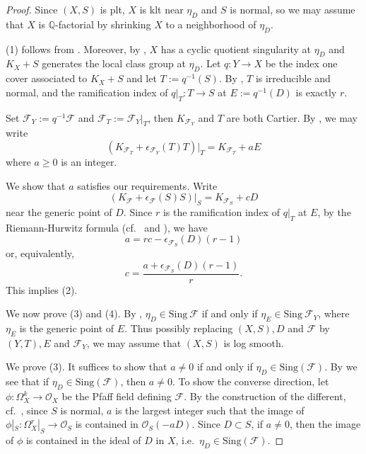 \documentclass[11pt,reqno]{amsart}
\numberwithin{equation}{section}
\newcommand{\Ff}{\mathcal{F}}
\newcommand{\Sing}{\mathrm{Sing}}
\theoremstyle{definition}
\begin{document}
\begin{proof}
Since $(X,S)$ is plt, $X$ is klt near $\eta_D$ and $S$ is normal, so we may assume that $X$ is $\mathbb Q$-factorial by shrinking $X$ to a neighborhood of $\eta_D$.

(1) follows from \cite[16.6 Proposition]{Kol+92}. Moreover, by  \cite[16.6 Proposition]{Kol+92}, $X$ has a cyclic quotient singularity at $\eta_D$ and $K_X+S$ generates the local class group at $\eta_D$. Let $q\colon Y\rightarrow X$ be the index one cover associated to $K_X+S$ and let $T:=q^{-1}(S)$. By \cite[16.6 Proposition]{Kol+92}, $T$ is irreducible and normal, and the ramification index of $q|_T: T\rightarrow S$ at $E:=q^{-1}(D)$ is exactly $r$. 

Set $\Ff_Y:=q^{-1}\Ff$ and $\Ff_T:=\Ff_Y|_T$, then $K_{\Ff_Y}$ and $T$ are both Cartier. By \cite[Proposition-Definition~3.7]{CS25a}, we may write
$$(K_{\Ff_T}+\epsilon_{\Ff_Y}(T)T)|_T=K_{\Ff_T}+aE$$
where $a\geq 0$ is an integer.

We show that $a$ satisfies our requirements. Write
$$(K_{\Ff}+\epsilon_{\Ff}(S)S)|_S=K_{\Ff_S}+cD$$
near the generic point of $D$. Since $r$ is the ramification index of $q|_T$ at $E$, by the Riemann-Hurwitz formula (cf.~\cite[Lemma~3.4]{Dru21} and \cite[Proposition~2.2]{CS25b}), we have
$$a=rc-\epsilon_{\Ff_S}(D)(r-1)$$
or, equivalently,
$$c=\frac{a+\epsilon_{\Ff_S}(D)(r-1)}{r}.$$
This implies (2).

We now prove (3) and (4). By \cite[Corollary~5.14]{Dru21}, $\eta_D \in \Sing~\Ff$ if and only if $\eta_E \in \Sing~\Ff_Y$, where $\eta_E$ is the generic point of $E$. Thus possibly replacing $(X,S),D$ and $\Ff$ by $(Y,T),E$ and $\Ff_Y$, we may assume that $(X,S)$ is log smooth. 

We prove (3). It suffices to show that $a \neq 0$ if and only if $\eta_D \in \Sing(\Ff)$. By \cite[Proposition~3.14(1)]{CS25a} we see that if $\eta_D\in\Sing(\Ff)$, then $a \neq 0$. To show the converse direction, let $\phi\colon \Omega_X^k \to \mathcal O_X$ be the Pfaff field defining $\mathcal F$. By the construction of the different, cf.~\cite[Lemma~3.5, Remark~3.6]{CS25a}, since $S$ is normal, $a$ is the largest integer such that the image of $\phi|_S\colon \Omega^r_X|_S \to \mathcal O_S$ is contained in $\mathcal O_S(-aD)$.
Since $D\subset S$, if $a \neq 0$, then the image of $\phi$ is contained in the ideal of $D$ in $X$, i.e.\ $\eta_D \in \Sing(\mathcal F)$.


\end{proof}
\end{document}
